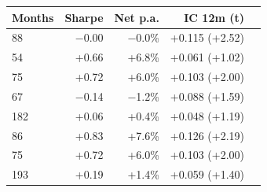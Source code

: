 \begin{tabular}{lrrrr}
\toprule
Months & Sharpe & Net p.a. & IC 12m (t) \\
\midrule
88 & $-$0.00 & $-$0.0\% & +0.115 (+2.52) \\
54 & +0.66 & +6.8\% & +0.061 (+1.02) \\
75 & +0.72 & +6.0\% & +0.103 (+2.00) \\
67 & $-$0.14 & $-$1.2\% & +0.088 (+1.59) \\
182 & +0.06 & +0.4\% & +0.048 (+1.19) \\
86 & +0.83 & +7.6\% & +0.126 (+2.19) \\
75 & +0.72 & +6.0\% & +0.103 (+2.00) \\
193 & +0.19 & +1.4\% & +0.059 (+1.40) \\
\bottomrule
\end{tabular}
